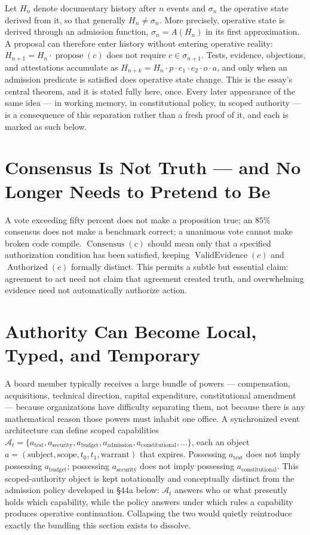 \documentclass[12pt]{article}
\begin{document}
Let $H_n$ denote documentary history after $n$ events and $\sigma_n$ the operative state derived from it, so that generally $H_n\neq\sigma_n$. More precisely, operative state is derived through an admission function, $\sigma_n=A(H_n)$ in its first approximation. A proposal can therefore enter history without entering operative reality: $H_{n+1}=H_n\cdot\operatorname{propose}(c)$ does not require $c\in\sigma_{n+1}$. Tests, evidence, objections, and attestations accumulate as $H_{n+k}=H_n\cdot p\cdot e_1\cdot e_2\cdot o\cdot a$, and only when an admission predicate is satisfied does operative state change. This is the essay's central theorem, and it is stated fully here, once. Every later appearance of the same idea — in working memory, in constitutional policy, in scoped authority — is a consequence of this separation rather than a fresh proof of it, and each is marked as such below.

\section{Consensus Is Not Truth — and No Longer Needs to Pretend to Be}

A vote exceeding fifty percent does not make a proposition true; an $85\%$ consensus does not make a benchmark correct; a unanimous vote cannot make broken code compile. $\operatorname{Consensus}(c)$ should mean only that a specified authorization condition has been satisfied, keeping $\operatorname{ValidEvidence}(c)$ and $\operatorname{Authorized}(c)$ formally distinct. This permits a subtle but essential claim: agreement to act need not claim that agreement created truth, and overwhelming evidence need not automatically authorize action.

\section{Authority Can Become Local, Typed, and Temporary}

A board member typically receives a large bundle of powers — compensation, acquisitions, technical direction, capital expenditure, constitutional amendment — because organizations have difficulty separating them, not because there is any mathematical reason those powers must inhabit one office. A synchronized event architecture can define scoped capabilities $\mathcal{A}_t=\{a_{\mathrm{test}},a_{\mathrm{security}},a_{\mathrm{budget}},a_{\mathrm{admission}},a_{\mathrm{constitutional}},\dots\}$, each an object $a=(\text{subject},\text{scope},t_0,t_1,\text{warrant})$ that expires. Possessing $a_{\mathrm{test}}$ does not imply possessing $a_{\mathrm{budget}}$; possessing $a_{\mathrm{security}}$ does not imply possessing $a_{\mathrm{constitutional}}$. This scoped-authority object is kept notationally and conceptually distinct from the admission policy developed in \S44a below: $\mathcal{A}_t$ answers who or what presently holds which capability, while the policy answers under which rules a capability produces operative continuation. Collapsing the two would quietly reintroduce exactly the bundling this section exists to dissolve.
\end{document}
